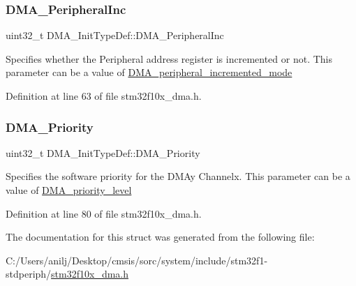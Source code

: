 \subsubsection{\texorpdfstring{D\+M\+A\+\_\+\+Peripheral\+Inc}{DMA\_PeripheralInc}}
{\footnotesize\ttfamily uint32\+\_\+t D\+M\+A\+\_\+\+Init\+Type\+Def\+::\+D\+M\+A\+\_\+\+Peripheral\+Inc}

Specifies whether the Peripheral address register is incremented or not. This parameter can be a value of \hyperlink{group___d_m_a__peripheral__incremented__mode}{D\+M\+A\+\_\+peripheral\+\_\+incremented\+\_\+mode} 

Definition at line 63 of file stm32f10x\+\_\+dma.\+h.

\mbox{\label{struct_d_m_a___init_type_def_ab9a17bd51778478cbd728c868206dca0}} 
\subsubsection{\texorpdfstring{D\+M\+A\+\_\+\+Priority}{DMA\_Priority}}
{\footnotesize\ttfamily uint32\+\_\+t D\+M\+A\+\_\+\+Init\+Type\+Def\+::\+D\+M\+A\+\_\+\+Priority}

Specifies the software priority for the D\+M\+Ay Channelx. This parameter can be a value of \hyperlink{group___d_m_a__priority__level}{D\+M\+A\+\_\+priority\+\_\+level} 

Definition at line 80 of file stm32f10x\+\_\+dma.\+h.



The documentation for this struct was generated from the following file\+:\begin{DoxyCompactItemize}
\item 
C\+:/\+Users/anilj/\+Desktop/cmsis/sorc/system/include/stm32f1-\/stdperiph/\hyperlink{stm32f10x__dma_8h}{stm32f10x\+\_\+dma.\+h}\end{DoxyCompactItemize}
